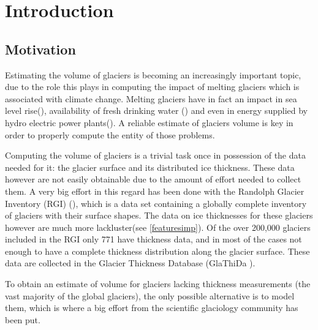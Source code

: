 \chapter{Introduction}\label{chap1}
\thispagestyle{plain}

\section{Motivation}\label{motivation}
Estimating the volume of glaciers is becoming an increasingly important topic, due to the role this plays in computing the impact of melting glaciers which is associated with climate change. Melting glaciers have in fact an impact in sea level rise(\citet{Zemp2017}), availability of fresh drinking water (\citet{Kaser2010}) and even in energy supplied by hydro electric power plants(\citet{Terrier2011}). A reliable estimate of glaciers volume is key in order to properly compute the entity of those problems.

Computing the volume of glaciers is a trivial task once in possession of the data needed for it: the glacier surface and its distributed ice thickness. These data however are not easily obtainable due to the amount of effort needed to collect them. A very big effort in this regard has been done with the Randolph Glacier Inventory (RGI) (\citet{RGI2014}), which is a data set containing a globally complete inventory of glaciers with their surface shapes. The data on ice thicknesses for these glaciers however are much more lackluster(see \ref{featuresimp}). Of the over 200,000 glaciers included in the RGI only 771 have thickness data, and in most of the cases not enough to have a complete thickness distribution along the glacier surface. These data are collected in the Glacier Thickness Database (GlaThiDa \citet{GlaThiDa2014}).

To obtain an estimate of volume for glaciers lacking thickness measurements (the vast majority of the global glaciers), the only possible alternative is to model them, which is where a big effort from the scientific glaciology community has been put.
  


